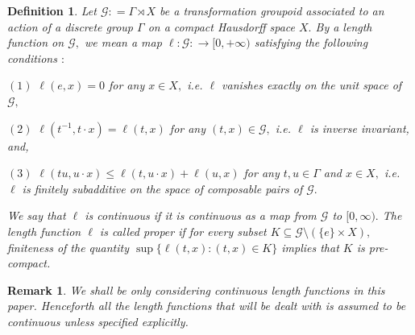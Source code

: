 \documentclass[a4paper,11pt,reqno]{amsart}
\theoremstyle{plain}
\newtheorem{defn}[thm]{Definition}
\newtheorem{rem}[thm]{Remark}
\theoremstyle{mainthmstyle}
\theoremstyle{named}
\numberwithin{equation}{section}
\begin{document}
\begin{defn}
Let $\mathcal G : = \Gamma \rtimes X$ be a transformation groupoid associated to an action of a discrete group $\Gamma$ on a compact Hausdorff space $X.$ By a length function on $\mathcal G,$ we mean a map $\ell : \mathcal G : \longrightarrow [0, +\infty)$ satisfying the following conditions $:$

\vspace{2mm}

$(1)$ $\ell (e, x) = 0$ for any $x \in X,$ i.e. $\ell$ vanishes exactly on the unit space of $\mathcal G,$

$(2)$ $\ell \left (t^{-1}, t \cdot x \right ) = \ell (t, x)$ for any $(t,x) \in \mathcal G,$ i.e. $\ell$ is inverse invariant, and,

$(3)$ $\ell (t u, u \cdot x) \leq \ell (t, u \cdot x) + \ell (u, x)$ for any $t, u \in \Gamma$ and $x \in X,$ i.e. $\ell$ is finitely subadditive on the space of composable pairs of $\mathcal G.$

\vspace{2mm}

We say that $\ell$ is continuous if it is continuous as a map from $\mathcal G$ to $[0, \infty).$ The length function \(\ell\) is called proper if for every subset $K \subseteq \mathcal G \setminus \left (\{e\} \times X \right ),$ finiteness of the quantity $\sup \{\ell (t, x) : (t, x) \in K\}$ implies that $K$ is pre-compact.


\end{defn}

\begin{rem}
We shall be only considering continuous length functions in this paper. Henceforth all the length functions that will be dealt with is assumed to be continuous unless specified explicitly.
\end{rem}
\end{document}
